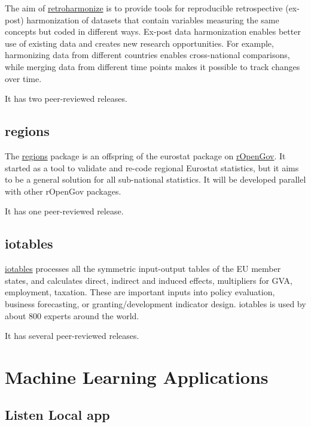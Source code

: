\documentclass[
  fontsize=13pt,
  english,
  a4paper,
  openany, a4paper, oneside]{book}
\begin{document}
The aim of \href{https://reprex.nl/software/retroharmonize/}{retroharmonize} is to provide tools for reproducible retrospective (ex-post) harmonization of datasets that contain variables measuring the same concepts but coded in different ways. Ex-post data harmonization enables better use of existing data and creates new research opportunities. For example, harmonizing data from different countries enables cross-national comparisons, while merging data from different time points makes it possible to track changes over time. \citep{R-retroharmonize}

It has two peer-reviewed releases.

\hypertarget{regions}{%
\subsection{regions}\label{regions}}

The \href{https://reprex.nl/software/regions/}{regions} package is an offspring of the eurostat package on \href{https://github.com/rOpenGov}{rOpenGov}. It started as a tool to validate and re-code regional Eurostat statistics, but it aims to be a general solution for all sub-national statistics. It will be developed parallel with other rOpenGov packages. \citep{R-regions}

It has one peer-reviewed release.

\hypertarget{iotables}{%
\subsection{iotables}\label{iotables}}

\href{https://reprex.nl/software/iotables/}{iotables} processes all the symmetric input-output tables of the EU member states, and calculates direct, indirect and induced effects, multipliers for GVA, employment, taxation. These are important inputs into policy evaluation, business forecasting, or granting/development indicator design. iotables is used by about 800 experts around the world. \citep{R-iotables}

It has several peer-reviewed releases.

\hypertarget{machine-learning}{%
\section{Machine Learning Applications}\label{machine-learning}}

\hypertarget{listen-local}{%
\subsection{Listen Local app}\label{listen-local}}
\end{document}
